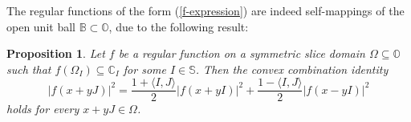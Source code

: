 \documentclass{amsart}
\newtheorem{proposition}[theorem]{Proposition}
\theoremstyle{definition}
\theoremstyle{remark}
\numberwithin{equation}{section}
\begin{document}
The regular functions of the form (\ref{f-expression}) are indeed self-mappings of the open unit ball $\mathbb B\subset\mathbb O$, due to the following result:

\begin{proposition}\label{convex combination identity}
Let $f$ be a regular function on a symmetric slice domain  $\Omega\subseteq \mathbb O$ such that $f(\Omega_I)\subseteq \mathbb C_I $ for some $I\in \mathbb S $.  Then
the convex combination identity
\begin{equation}\label{convex combination identity01}
\big|f(x+yJ)\big|^2 =\frac{1+\langle I,J\rangle}{2}\big|f(x+yI)\big|^2+
\frac{1-\langle I,J\rangle}{2}\big|f(x-yI)\big|^2
\end{equation}
holds for every $ x+yJ \in \Omega$.
\end{proposition}
\end{document}
